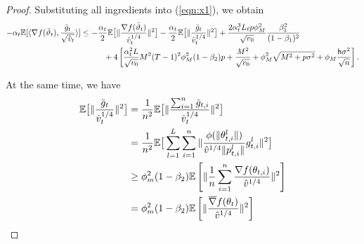 \documentclass[11pt]{article}
\def\tot{\mathsf{h}}
\begin{document}
\begin{proof}
Substituting all ingredients into (\ref{eqn:x1}), we obtain
\begin{align}\notag
    -\alpha_t \mathbb E[\langle \nabla f(\bar \vartheta_t),\frac{\bar g_t}{\sqrt{\hat v_t}} \rangle] &\leq -\frac{\alpha_t}{2}\mathbb E\big[\Vert \frac{\nabla f(\bar\vartheta_t) }{\hat v_t^{1/4}}\Vert^2 \big]-\frac{\alpha_t}{2}\mathbb E\big[\Vert \frac{\bar g_t }{\hat v_t^{1/4}}\Vert^2 \big]+\frac{2\alpha_t^3 L_\ell p\phi_M^2}{ \sqrt{v_0}}\frac{\beta_1^2}{(1-\beta_1)^2} \\\notag
    &\hspace{0.4in}  + 4 \left[ \frac{\alpha_t^2 L}{\sqrt{v_0}} M^2 (T-1)^2 \phi_M^2 (1-\beta_2)p + \frac{M^2}{\sqrt{v_0}}+\phi_M^2\sqrt{M^2+p\sigma^2} + \phi_M \frac{\tot \sigma^2}{\sqrt{n}}\right].
\end{align}

\newpage

At the same time, we have
\begin{align}\notag
    \mathbb E\big[\Vert \frac{\bar g_t }{\hat v_t^{1/4}}\Vert^2\big]&=\frac{1}{n^2}\mathbb E\big[\Vert \frac{\sum_{i=1}^n \bar g_{t,i}}{\hat v_t^{1/4}}\Vert^2 \big]\\\notag
    &=\frac{1}{n^2}\mathbb E\big[ \sum_{l=1}^L \sum_{i=1}^n \Vert  \frac{\phi(\Vert \theta_{t,i}^l\Vert)}{\hat v^{1/4} \Vert p_{t,i}^l\Vert}g_{t,i}^l \Vert^2 \big]\\\notag
    &\geq \phi_m^2(1-\beta_2) \mathbb E\left[ \Vert \frac{1}{n}\sum_{i=1}^n \frac{\nabla f(\theta_{t,i})}{\hat v^{1/4}} \Vert^2 \right]\\\notag
    &=\phi_m^2(1-\beta_2) \mathbb E\left[ \Vert  \frac{\overline\nabla f(\theta_{t})}{\hat v^{1/4}} \Vert^2 \right]
\end{align}



\end{proof}
\end{document}
